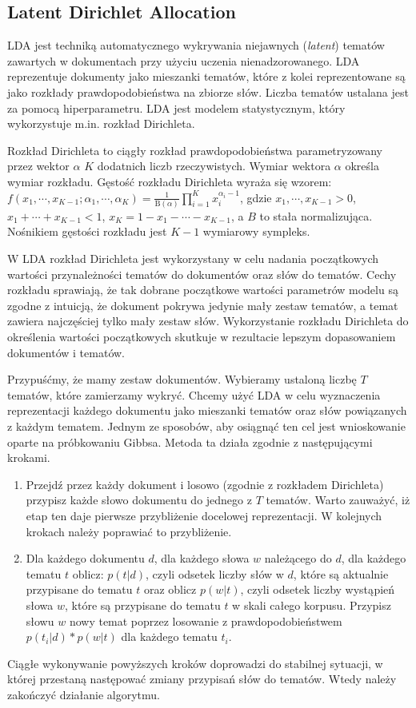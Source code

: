 \documentclass[pl]{minipw} %
\begin{document}
\subsection{Latent Dirichlet Allocation}

LDA \cite{lda} jest techniką automatycznego wykrywania niejawnych (\textit{latent}) tematów zawartych w dokumentach przy użyciu uczenia nienadzorowanego. LDA reprezentuje dokumenty jako mieszanki tematów, które z kolei reprezentowane są jako rozkłady prawdopodobieństwa na zbiorze słów. Liczba tematów ustalana jest za pomocą hiperparametru. LDA jest modelem statystycznym, który wykorzystuje m.in. rozkład Dirichleta. 

Rozkład Dirichleta to ciągły rozkład prawdopodobieństwa parametryzowany przez wektor $\alpha$ $K$ dodatnich liczb rzeczywistych. Wymiar wektora $\alpha$ określa wymiar rozkładu. Gęstość rozkładu Dirichleta wyraża się wzorem: $ f\left(x_{1},\cdots ,x_{K-1};\alpha _{1},\cdots ,\alpha _{K}\right)={\frac {1}{\mathrm {B} (\alpha )}}\prod _{i=1}^{K}x_{i}^{\alpha _{i}-1}$, gdzie $ x_{1},\cdots ,x_{K-1}>0$, $x_{1}+\cdots +x_{K-1}<1$, $x_{K}=1-x_{1}-\cdots -x_{K-1}$, a $B$ to stała normalizująca. Nośnikiem gęstości rozkładu jest $K-1$ wymiarowy sympleks.

W LDA rozkład Dirichleta jest wykorzystany w celu nadania początkowych wartości przynależności tematów do dokumentów oraz słów do tematów. Cechy rozkładu sprawiają, że tak dobrane początkowe wartości parametrów modelu są zgodne z intuicją, że dokument pokrywa jedynie mały zestaw tematów, a temat zawiera najczęściej tylko mały zestaw słów. Wykorzystanie rozkładu Dirichleta do określenia wartości początkowych skutkuje w rezultacie lepszym dopasowaniem dokumentów i tematów.

Przypuśćmy, że mamy zestaw dokumentów. Wybieramy ustaloną liczbę $T$ tematów, które zamierzamy wykryć. Chcemy użyć LDA w celu wyznaczenia reprezentacji każdego dokumentu jako mieszanki tematów oraz słów powiązanych z każdym tematem. Jednym ze sposobów, aby osiągnąć ten cel jest wnioskowanie oparte na próbkowaniu Gibbsa. Metoda ta działa zgodnie z następującymi krokami.

\begin{enumerate}
	\item Przejdź przez każdy dokument i losowo (zgodnie z rozkładem Dirichleta) przypisz każde słowo dokumentu do jednego z $T$ tematów.
	Warto zauważyć, iż etap ten daje pierwsze przybliżenie docelowej reprezentacji. W kolejnych krokach należy poprawiać to przybliżenie.
	\item Dla każdego dokumentu $d$, dla każdego słowa $w$ należącego do $d$, dla każdego tematu $t$ oblicz: $p(t | d)$, czyli odsetek liczby słów w $d$, które są aktualnie przypisane do tematu $t$ oraz oblicz $p(w | t)$, czyli odsetek liczby wystąpień słowa $w$, które są przypisane do tematu $t$ w skali całego korpusu. Przypisz słowu $w$ nowy temat poprzez losowanie z prawdopodobieństwem $p(t_i|d)*p(w|t)$ dla każdego tematu $t_i$.
\end{enumerate}
Ciągłe wykonywanie powyższych kroków doprowadzi do stabilnej sytuacji, w której przestaną następować zmiany przypisań słów do tematów. Wtedy należy zakończyć działanie algorytmu.
\end{document}
